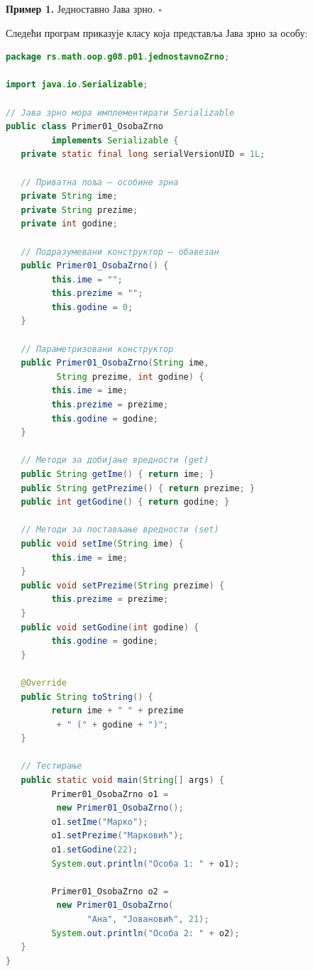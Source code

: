 \bigskip

\noindent \textbf{Пример 1.} Једноставно Јава зрно. $\square$

\medskip

Следећи програм приказује класу која представља Јава зрно за особу:


\begin{lstlisting}[language=Java]
package rs.math.oop.g08.p01.jednostavnoZrno;
 
import java.io.Serializable;
 
// Јава зрно мора имплементирати Serializable
public class Primer01_OsobaZrno
         implements Serializable {
   private static final long serialVersionUID = 1L;
 
   // Приватна поља – особине зрна
   private String ime;
   private String prezime;
   private int godine;
 
   // Подразумевани конструктор – обавезан
   public Primer01_OsobaZrno() {
         this.ime = "";
         this.prezime = "";
         this.godine = 0;
   }
 
   // Параметризовани конструктор
   public Primer01_OsobaZrno(String ime,
          String prezime, int godine) {
         this.ime = ime;
         this.prezime = prezime;
         this.godine = godine;
   }
 
   // Методи за добијање вредности (get)
   public String getIme() { return ime; }
   public String getPrezime() { return prezime; }
   public int getGodine() { return godine; }
 
   // Методи за постављање вредности (set)
   public void setIme(String ime) {
         this.ime = ime;
   }
   public void setPrezime(String prezime) {
         this.prezime = prezime;
   }
   public void setGodine(int godine) {
         this.godine = godine;
   }
 
   @Override
   public String toString() {
         return ime + " " + prezime
          + " (" + godine + ")";
   }
 
   // Тестирање
   public static void main(String[] args) {
         Primer01_OsobaZrno o1 =
          new Primer01_OsobaZrno();
         o1.setIme("Марко");
         o1.setPrezime("Марковић");
         o1.setGodine(22);
         System.out.println("Особа 1: " + o1);
 
         Primer01_OsobaZrno o2 =
          new Primer01_OsobaZrno(
                "Ана", "Јовановић", 21);
         System.out.println("Особа 2: " + o2);
   }
}
\end{lstlisting}


